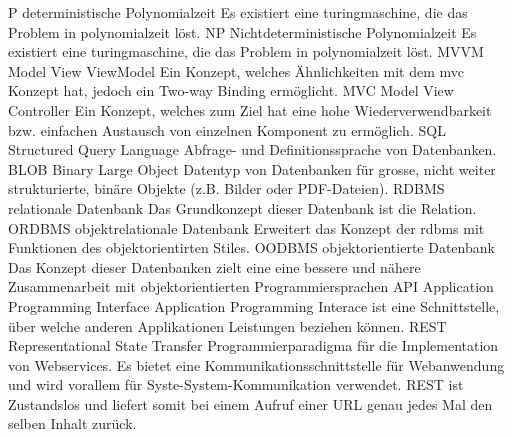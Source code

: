   {P}               %
  {deterministische Polynomialzeit}  %
  {Es existiert eine  \gls{turingmaschine}, die das Problem in \gls{polynomialzeit} löst.}
  {NP}               %
  {Nichtdeterministische Polynomialzeit}  %
  {Es existiert eine  \gls{turingmaschine}, die das Problem in \gls{polynomialzeit} löst.}
  {MVVM}               %
  {Model View ViewModel}  %
  {Ein Konzept, welches Ähnlichkeiten mit dem \gls{mvc} Konzept hat, jedoch ein Two-way Binding ermöglicht.}
  {MVC}               %
  {Model View Controller}  %
  {Ein Konzept, welches zum Ziel hat eine hohe Wiederverwendbarkeit bzw. einfachen Austausch von einzelnen Komponent zu ermöglich.}  
  {SQL}               %
  {Structured Query Language}  %
  {Abfrage- und Definitionssprache von Datenbanken.}
  {BLOB}               %
  {Binary Large Object}  %
  {Datentyp von Datenbanken für grosse, nicht weiter strukturierte, binäre Objekte (z.B. Bilder oder PDF-Dateien).}
  {RDBMS}               %
  {relationale Datenbank}  %
  {Das Grundkonzept dieser Datenbank ist die Relation.}
  {ORDBMS}               %
  {objektrelationale Datenbank}  %
  {Erweitert das Konzept der \gls{rdbms} mit Funktionen des objektorientirten Stiles.}
  {OODBMS}               %
  {objektorientierte Datenbank}  %
  {Das Konzept dieser Datenbanken zielt eine eine bessere und nähere Zusammenarbeit mit objektorientierten Programmiersprachen}
  {API}               %
  {Application Programming Interface}
  {Application Programming Interace ist eine Schnittstelle, über welche anderen Applikationen Leistungen beziehen können.}
  {REST}               %
  {Representational State Transfer}
  {Programmierparadigma für die Implementation von Webservices. Es bietet eine Kommunikationsschnittstelle für Webanwendung und 
wird vorallem für Syste-System-Kommunikation verwendet. REST ist Zustandslos und liefert somit bei einem Aufruf einer URL genau 
jedes Mal den selben Inhalt zurück.}
